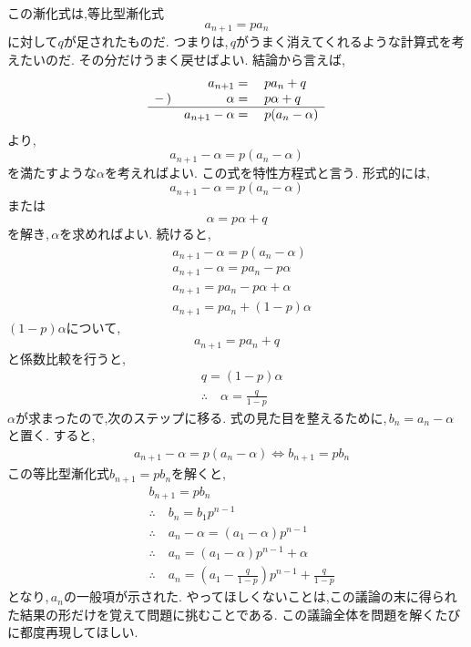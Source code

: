 \documentclass[dvipdfmx,a4paper,11pt,fleqn,openany]{jsbook}
\begin{document}
    この漸化式は,等比型漸化式
    \[
      a_{n+1}=pa_n
    \]
    に対して$q$が足されたものだ.
    つまりは,\,$q$がうまく消えてくれるような計算式を考えたいのだ.
    その分だけうまく戻せばよい.
    結論から言えば,
    \[
      \begin{array}{rrl}
         & a_{n+1}={} & pa_n+q\\
        -\,) & \alpha={} & p\alpha+q\\ \hline
         & a_{n+1}-\alpha={} & p(a_n-\alpha)
      \end{array}
    \]
    より,
    \[
      a_{n+1}-\alpha=p(a_n-\alpha)
    \]
    を満たすような$\alpha$を考えればよい.
    この式を特性方程式と言う.
    形式的には,
    \[
      a_{n+1}-\alpha=p(a_n-\alpha)
    \]
    または
    \[
      \alpha=p\alpha+q
    \]
    を解き,\,$\alpha$を求めればよい.
    続けると,
    \begin{align*}
      &a_{n+1}-\alpha=p(a_n-\alpha)\\
      &a_{n+1}-\alpha=pa_n-p\alpha\\
      &a_{n+1}=pa_n-p\alpha+\alpha\\
      &a_{n+1}=pa_n+(1-p)\alpha
    \end{align*}
    $(1-p)\alpha$について,
    \[
      a_{n+1}=pa_n+q
    \]
    と係数比較を行うと,
    \begin{align*}
      &q=(1-p)\alpha\\
      &\therefore \quad \alpha=\frac{q}{1-p}
    \end{align*}
    $\alpha$が求まったので,次のステップに移る.
    式の見た目を整えるために,\,$b_n=a_n-\alpha$と置く.
    すると,
    \begin{align*}
      &a_{n+1}-\alpha=p(a_n-\alpha) \iff b_{n+1}=pb_n
    \end{align*}
    この等比型漸化式$b_{n+1}=pb_n$を解くと,
    \begin{align*}
      &b_{n+1}=pb_n\\
      &\therefore \quad b_n=b_1p^{n-1}\\
      &\therefore \quad a_n-\alpha=(a_1-\alpha)p^{n-1}\\
      &\therefore \quad a_n=(a_1-\alpha)p^{n-1}+\alpha\\
      &\therefore \quad a_n=\left(a_1-\frac{q}{1-p}\right)p^{n-1}+\frac{q}{1-p}
    \end{align*}
    となり,\,$a_n$の一般項が示された.
    やってほしくないことは,この議論の末に得られた結果の形だけを覚えて問題に挑むことである.
    この議論全体を問題を解くたびに都度再現してほしい.
\end{document}
